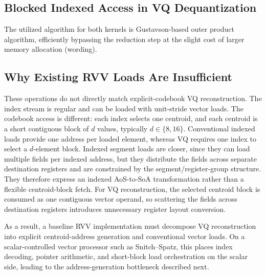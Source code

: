 \documentclass[conference]{IEEEtran}
\begin{document}
\subsection{Blocked Indexed Access in VQ Dequantization}

The utilized algorithm for both kernels is Gustavson-based outer product algorithm, efficiently bypassing the reduction step at the slight cost of larger memory allocation (wording).

  \subsection{Why Existing RVV Loads Are Insufficient}

These operations do not directly match explicit-codebook VQ reconstruction.
The index stream is regular and can be loaded with unit-stride vector loads.
The codebook access is different: each index selects one centroid, and each
centroid is a short contiguous block of \(d\) values, typically \(d \in
\{8,16\}\). Conventional indexed loads provide one address per loaded element,
whereas VQ requires one index to select a \(d\)-element block. Indexed segment
loads are closer, since they can load multiple fields per indexed address, but
they distribute the fields across separate destination registers and are
constrained by the segment/register-group structure. They therefore express an
indexed AoS-to-SoA transformation rather than a flexible centroid-block fetch.
For VQ reconstruction, the selected centroid block is consumed as one contiguous
vector operand, so scattering the fields across destination registers introduces
unnecessary register layout conversion.

As a result, a baseline RVV implementation must decompose VQ reconstruction
into explicit centroid-address generation and conventional vector loads. On a
scalar-controlled vector processor such as Snitch--Spatz, this places index
decoding, pointer arithmetic, and short-block load orchestration on the scalar
side, leading to the address-generation bottleneck described next.





\end{document}
